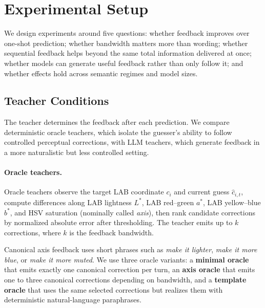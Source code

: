 \documentclass[11pt]{article}
\begin{document}

\section{Experimental Setup}
\label{sec:experimental_setup}

We design experiments around five questions: whether feedback improves over
one-shot prediction; whether bandwidth matters more than wording; whether
sequential feedback helps beyond the same total information delivered at
once; whether models can generate useful feedback rather than only follow
it; and whether effects hold across semantic regimes and model sizes.

\subsection{Teacher Conditions}
\label{sec:teachers}

The teacher determines the feedback after each prediction. We compare
deterministic oracle teachers, which isolate the guesser's ability to follow
controlled perceptual corrections, with LLM teachers, which generate
feedback in a more naturalistic but less controlled setting.

\paragraph{Oracle teachers.}
Oracle teachers observe the target LAB coordinate $c_i$ and current guess
$\hat{c}_{i,t}$, compute differences along LAB lightness $L^\ast$, LAB
red--green $a^\ast$, LAB yellow--blue $b^\ast$, and HSV saturation (nominally called \emph{axis}), then
rank candidate corrections by normalized absolute error after thresholding.
The teacher emits up to $k$ corrections, where $k$ is the feedback
bandwidth.

Canonical axis feedback uses short phrases such as \textit{make it
lighter}, \textit{make it more blue}, or \textit{make it more muted}. We use
three oracle variants: a \textbf{minimal oracle} that emits exactly one
canonical correction per turn, an \textbf{axis oracle} that emits one to
three canonical corrections depending on bandwidth, and a \textbf{template
oracle} that uses the same selected corrections but realizes them with
deterministic natural-language paraphrases.
\end{document}
